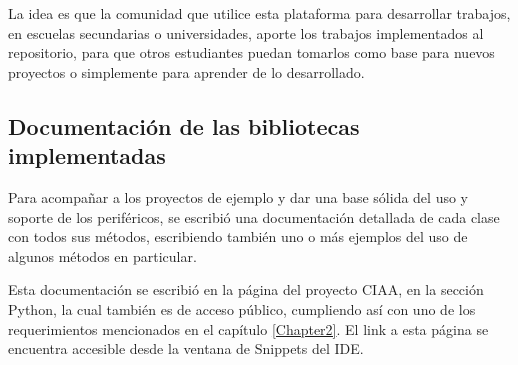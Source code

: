 La idea es que la comunidad que utilice esta plataforma para desarrollar trabajos, en escuelas secundarias o universidades, aporte los trabajos implementados al repositorio, para que otros estudiantes puedan tomarlos como base para nuevos proyectos o simplemente para aprender de lo desarrollado.

\subsection{Documentación de las bibliotecas implementadas} 

Para acompañar a los proyectos de ejemplo y dar una base sólida del uso y soporte de los periféricos, se escribió una documentación detallada de cada clase con todos sus métodos, escribiendo también uno o más ejemplos del uso de algunos métodos en particular.

Esta documentación se escribió en la página del proyecto CIAA, en la sección Python\cite{bibpython}, la cual también es de acceso público, cumpliendo así con uno de los requerimientos mencionados en el capítulo \ref{Chapter2}. El link a esta página se encuentra accesible desde la ventana de Snippets del IDE.







